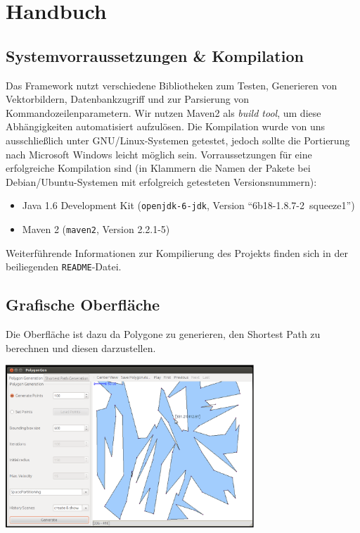 \section{Handbuch}
  \label{sec:manual}

  \subsection{Systemvorraussetzungen \& Kompilation}

    Das Framework nutzt verschiedene Bibliotheken zum Testen, Generieren von
    Vektorbildern, Datenbankzugriff und zur Parsierung von
    Kommandozeilenparametern. Wir nutzen Maven2 als \emph{build tool}, um
    diese Abhängigkeiten automatisiert aufzulösen. Die Kompilation wurde von
    uns ausschließlich unter GNU/Linux-Systemen getestet, jedoch sollte die
    Portierung nach Microsoft Windows leicht möglich sein. Vorraussetzungen
    für eine erfolgreiche Kompilation sind (in Klammern die Namen der Pakete
    bei Debian/Ubuntu-Systemen mit erfolgreich getesteten Versionsnummern):

    \begin{itemize}
      \item Java 1.6 Development Kit (\texttt{openjdk-6-jdk}, 
            Version \enquote{6b18-1.8.7-2~squeeze1})
      \item Maven 2 (\texttt{maven2}, Version 2.2.1-5)
    \end{itemize}

    Weiterführende Informationen zur Kompilierung des Projekts finden sich in
    der beiliegenden \texttt{README}-Datei.

  \subsection{Grafische Oberfläche}

    Die Oberfläche ist dazu da Polygone zu generieren, den Shortest Path zu
    berechnen und diesen darzustellen.\\

    \begin{center}
      \includegraphics[width=0.7\textwidth]{img/GUI.eps}
    \end{center}

